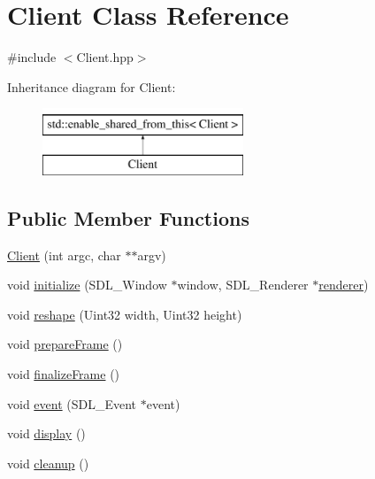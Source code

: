 \hypertarget{classClient}{\section{Client Class Reference}
\label{classClient}
}


{\ttfamily \#include $<$Client.\-hpp$>$}

Inheritance diagram for Client\-:\begin{figure}[H]
\begin{center}
\leavevmode
\includegraphics[height=2.000000cm]{classClient}
\end{center}
\end{figure}
\subsection*{Public Member Functions}
\begin{DoxyCompactItemize}
\item 
\hyperlink{classClient_a131afa9610b6b315e2682ca32d04a436}{Client} (int argc, char $\ast$$\ast$argv)
\item 
void \hyperlink{classClient_a15ef4f954f969ee63bdfde3889d1b030}{initialize} (S\-D\-L\-\_\-\-Window $\ast$window, S\-D\-L\-\_\-\-Renderer $\ast$\hyperlink{classClient_a86f232e1c10bf55bb1512814de486c3a}{renderer})
\item 
void \hyperlink{classClient_a6fa6f1a47367f50ad7d0f3b6f54c2822}{reshape} (Uint32 width, Uint32 height)
\item 
void \hyperlink{classClient_a1f697d07416dc84acaf7a5ad51cb57e6}{prepare\-Frame} ()
\item 
void \hyperlink{classClient_a8a83ae709ae5f53c49c9310d20fd2e8f}{finalize\-Frame} ()
\item 
void \hyperlink{classClient_a221b46cfcfe9a33529aab1d7e17cfbfd}{event} (S\-D\-L\-\_\-\-Event $\ast$event)
\item 
void \hyperlink{classClient_aac06b7c382ef3dcd8fd1304c5dbfa4eb}{display} ()
\item 
void \hyperlink{classClient_ab041d37730a80c6af56564c102e073f1}{cleanup} ()
\end{DoxyCompactItemize}
